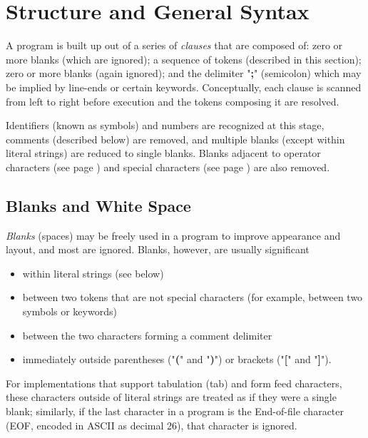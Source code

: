 \chapter{Structure and General Syntax}\label{refclau}
\index{,}
 A \nr{} program is built up out of a series of \emph{clauses} that
are composed of: zero or more blanks (which are ignored); a sequence of
tokens (described in this section); zero or more blanks (again
ignored); and the delimiter "\textbf{;}" (semicolon) which may
be implied by line-ends or certain keywords.
Conceptually, each clause is scanned from left to right before
execution and the tokens composing it are resolved.
 
Identifiers (known as symbols) and numbers are recognized at this stage,
comments (described below) are removed, and multiple blanks (except
within literal strings) are reduced to single blanks.
Blanks adjacent to  operator characters (see page \pageref{refopers})  and
 special characters (see page \pageref{refspecs})  are also removed.
\section{Blanks and White Space}\label{refblank}
 \emph{Blanks} (spaces) may be freely used in a program to
improve appearance and layout, and most are ignored.
Blanks, however, are usually significant
\begin{itemize}
\item within literal strings (see below)
\item between two tokens that are not special characters (for example,
between two symbols or keywords)
\item between the two characters forming a comment delimiter
\item immediately outside parentheses ("\textbf{(}" and
"\textbf{)}") or brackets ("\textbf{[}" and
"\textbf{]}").
\end{itemize}
 
For implementations that support tabulation (tab) and form feed
characters, these characters outside of literal strings are treated as
if they were a single blank; similarly, if the last character in a
\nr{} program is the End-of-file character (EOF, encoded in ASCII as
decimal 26), that character is ignored.
